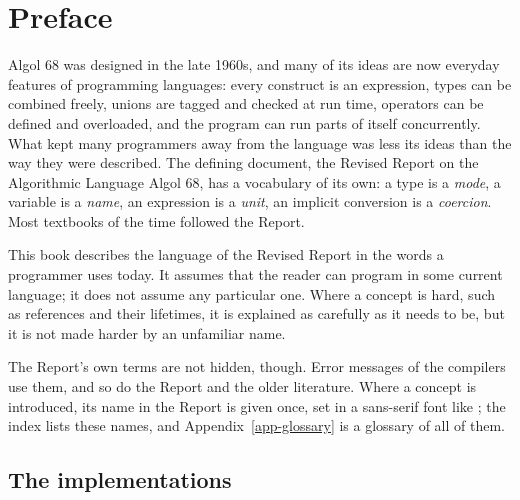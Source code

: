 \chapter*{Preface}

Algol 68 was designed in the late 1960s, and many of its ideas are now
everyday features of programming languages: every construct is an
expression, types can be combined freely, unions are tagged and checked
at run time, operators can be defined and overloaded, and the program can
run parts of itself concurrently. What kept many programmers away from the
language was less its ideas than the way they were described. The defining
document, the Revised Report on the Algorithmic Language Algol 68, has a
vocabulary of its own: a type is a \emph{mode}, a variable is a
\emph{name}, an expression is a \emph{unit}, an implicit conversion is a
\emph{coercion}. Most textbooks of the time followed the Report.

This book describes the language of the Revised Report in the words a
programmer uses today. It assumes that the reader can program in some
current language; it does not assume any particular one. Where a concept
is hard, such as references and their lifetimes, it is explained as
carefully as it needs to be, but it is not made harder by an unfamiliar
name.

The Report's own terms are not hidden, though. Error messages of the
compilers use them, and so do the Report and the older literature. Where a
concept is introduced, its name in the Report is given once, set in a
sans-serif font like ; the index lists these names, and
Appendix~\ref{app-glossary} is a glossary of all of them.

\section*{The implementations}

